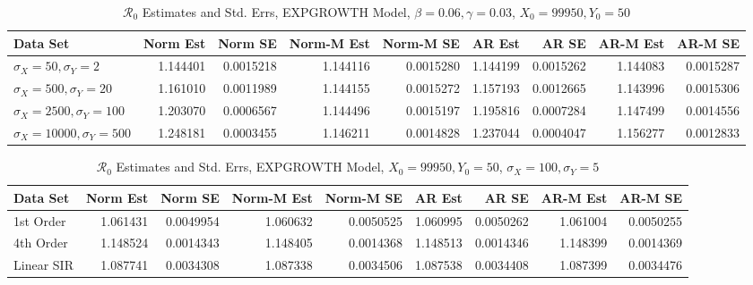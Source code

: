 \documentclass[12pt]{article}
\newcommand{\rr}{\ensuremath{\mathcal{R}_0}}
\begin{document}
\begin{table}
	
	\caption{\label{tab:}$\rr$ Estimates and Std. Errs, EXPGROWTH Model,
		$\beta = 0.06, \gamma = 0.03$, $X_0 = 99950, Y_0 = 50$}
	\centering
	\begin{tabular}[t]{l|r|r|r|r|r|r|r|r}
		\hline
		Data Set & Norm Est & Norm SE & Norm-M Est & Norm-M SE & AR Est & AR SE & AR-M Est & AR-M SE\\
		\hline
		$\sigma_X = 50, \sigma_Y = 2$ & 1.144401 & 0.0015218 & 1.144116 & 0.0015280 & 1.144199 & 0.0015262 & 1.144083 & 0.0015287\\
		\hline
		$\sigma_X = 500, \sigma_Y = 20$ & 1.161010 & 0.0011989 & 1.144155 & 0.0015272 & 1.157193 & 0.0012665 & 1.143996 & 0.0015306\\
		\hline
		$\sigma_X = 2500, \sigma_Y = 100$ & 1.203070 & 0.0006567 & 1.144496 & 0.0015197 & 1.195816 & 0.0007284 & 1.147499 & 0.0014556\\
		\hline
		$\sigma_X = 10000, \sigma_Y = 500$ & 1.248181 & 0.0003455 & 1.146211 & 0.0014828 & 1.237044 & 0.0004047 & 1.156277 & 0.0012833\\
		\hline
	\end{tabular}
\end{table}

\begin{table}
	
	\caption{\label{tab:}$\rr$ Estimates and Std. Errs, EXPGROWTH Model,
		$X_0 = 99950, Y_0 = 50$, $\sigma_X = 100, \sigma_Y = 5$}
	\centering
	\begin{tabular}[t]{l|r|r|r|r|r|r|r|r}
		\hline
		Data Set & Norm Est & Norm SE & Norm-M Est & Norm-M SE & AR Est & AR SE & AR-M Est & AR-M SE\\
		\hline
		1st Order & 1.061431 & 0.0049954 & 1.060632 & 0.0050525 & 1.060995 & 0.0050262 & 1.061004 & 0.0050255\\
		\hline
		4th Order & 1.148524 & 0.0014343 & 1.148405 & 0.0014368 & 1.148513 & 0.0014346 & 1.148399 & 0.0014369\\
		\hline
		Linear SIR & 1.087741 & 0.0034308 & 1.087338 & 0.0034506 & 1.087538 & 0.0034408 & 1.087399 & 0.0034476\\
		\hline
	\end{tabular}
\end{table}
\end{document}
